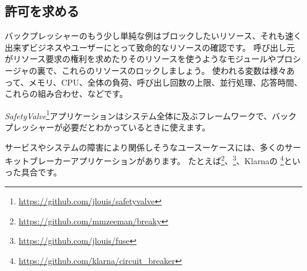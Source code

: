\subsection{許可を求める}

バックプレッシャーのもう少し単純な例はブロックしたいリソース、それも速く出来ずビジネスやユーザーにとって致命的なリソースの確認です。
呼び出し元がリソース要求の権利を求めたりそのリソースを使うようなモジュールやプロシージャの裏で、これらのリソースのロックしましょう。
使われる変数は様々あって、メモリ、CPU、全体の負荷、呼び出し回数の上限、並行処理、応答時間、これらの組み合わせ、などです。

\emph{SafetyValve}\footnote{\href{https://github.com/jlouis/safetyvalve}{https://github.com/jlouis/safetyvalve}}アプリケーションはシステム全体に及ぶフレームワークで、バックプレッシャーが必要だとわかっているときに使えます。

サービスやシステムの障害により関係しそうなユースーケースには、多くのサーキットブレーカーアプリケーションがあります。
たとえば\footnote{\href{https://github.com/mmzeeman/breaky}{https://github.com/mmzeeman/breaky}}、\footnote{\href{https://github.com/jlouis/fuse}{https://github.com/jlouis/fuse}}、Klarnaの \footnote{\href{https://github.com/klarna/circuit\_breaker}{https://github.com/klarna/circuit\_breaker}}といった具合です。

